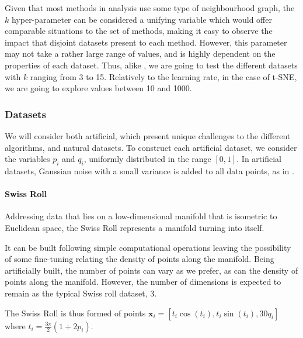 Given that most methods in analysis use some type of neighbourhood graph, the $k$ hyper-parameter can be considered a unifying variable which would offer comparable situations to the set of methods, making it easy to observe the impact that disjoint datasets present to each method. However, this parameter may not take a rather large range of values, and is highly dependent on the properties of each dataset. Thus, alike \cite{comparison}, we are going to test the different datasets with $k$ ranging from $3$ to 15. Relatively to the learning rate, in the case of t-SNE, we are going to explore values between 10 and 1000.


\subsubsection{Datasets}

We will consider both artificial, which present unique challenges to the different algorithms, and natural datasets. To construct each artificial dataset, we consider the variables $p_i$ and $q_i$, uniformly distributed in the range $[0, 1]$. In artificial datasets, Gaussian noise with a small variance is added to all data points, as in \cite{comparison}.

\paragraph{Swiss Roll}
Addressing data that lies on a low-dimensional manifold that is isometric to Euclidean space, the Swiss Roll
represents a manifold turning into itself.

It can be built following simple computational operations leaving the possibility of some fine-tuning relating the density of points along the manifold. Being artificially built, the number of points can vary as we prefer, as can the density of points along the manifold.
However, the number of dimensions is expected to remain as the typical Swiss roll dataset, 3.

The Swiss Roll is thus formed of points $\bm{x}_i = [t_i \cos(t_i), t_i \sin(t_i), 30q_i]$ where $t_i = \frac{3\pi}{2}(1+2p_i)$.

